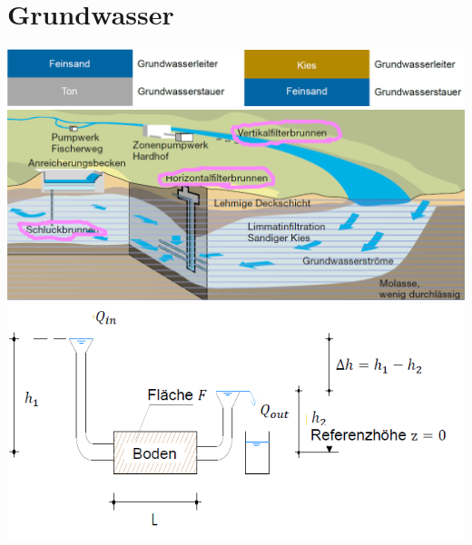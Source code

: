 

\begin{minipage}{0.35\linewidth}

\section{Grundwasser}

	\includegraphics[width=\linewidth]{images/GW1Stauer.PNG} \\
	\includegraphics[width=0.9\linewidth]{images/GW2Fassung.PNG} \\
	
	\includegraphics[width=\linewidth]{images/GW3Darcy.PNG} \\
\end{minipage}	
